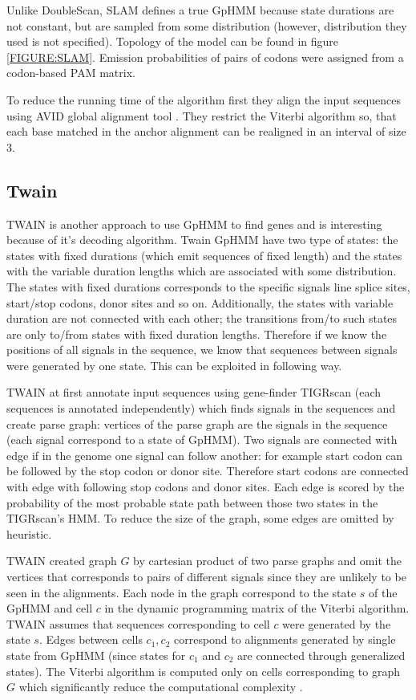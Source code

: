 Unlike DoubleScan, SLAM defines a true GpHMM because state durations are not
constant, but are sampled from some distribution (however, distribution they
used is not specified). Topology of the model can be found in figure
\ref{FIGURE:SLAM}.  Emission probabilities of pairs of codons were assigned from
a codon-based PAM matrix.


To reduce the running time of the algorithm first they  align the input
sequences using AVID global alignment tool \cite{Bray2003}. They restrict the
Viterbi algorithm so, that each base matched in the anchor alignment can be
realigned in an interval of size $3$.

\subsection{Twain}

TWAIN is another approach to use GpHMM to find genes \cite{Majoros2005} and is
interesting because of it's decoding algorithm. Twain GpHMM have two type of
states: the states with fixed durations (which emit sequences of fixed length)
and the states with the variable duration lengths which are associated with some
distribution.  The states with fixed durations corresponds to the specific
signals line splice sites, start/stop codons, donor sites and so on.
Additionally, the states with variable duration are not connected with each
other; the transitions from/to such states are only to/from states with fixed
duration lengths. Therefore if we know the positions of all signals in the
sequence, we know that sequences between signals were generated by one state.
This can be exploited in following way.

TWAIN at first annotate input sequences using gene-finder TIGRscan
\cite{Majoros2004} (each sequences is annotated independently) which finds
signals in the sequences and create parse graph: vertices of the parse graph are
the signals in the sequence (each signal correspond to a state of GpHMM).  Two
signals are connected with edge if in the genome one signal can follow another:
for example start codon can be followed by the stop codon or donor site.
Therefore start codons are connected with edge with following stop codons and
donor sites. Each edge is scored by the probability of the most probable state
path between those two states in the TIGRscan's HMM. To reduce the size of the
graph, some edges are omitted by heuristic.

TWAIN created graph $G$ by cartesian product of two parse graphs and omit the
vertices that corresponds to pairs of different signals since they are unlikely
to be seen in the alignments. Each node in the graph correspond to the state $s$
of the GpHMM and cell $c$ in the dynamic programming matrix of the Viterbi
algorithm. TWAIN assumes that sequences corresponding to cell $c$ were generated
by the state $s$.  Edges between cells $c_1,c_2$ correspond to alignments
generated by single state from GpHMM (since states for $c_1$ and $c_2$ are
connected through generalized states).  The Viterbi algorithm is computed only
on cells corresponding to graph $G$ which significantly reduce the computational
complexity \cite{Majoros2005}.

